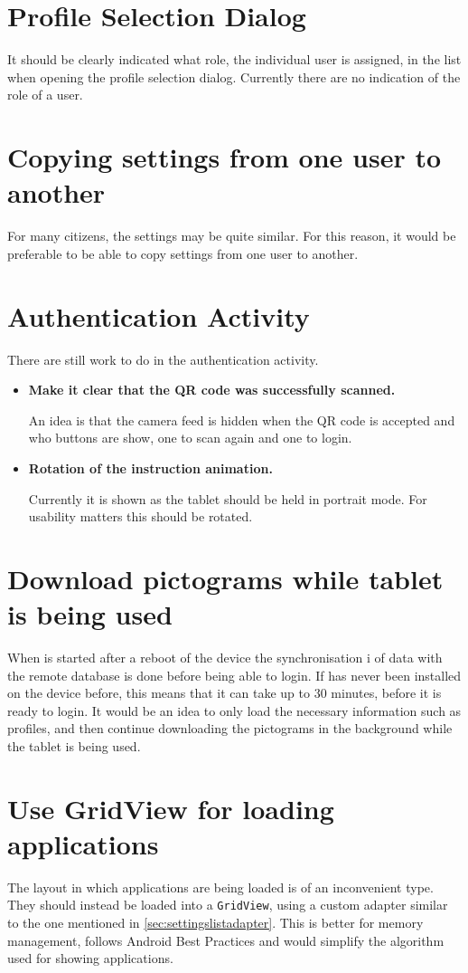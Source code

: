 \section{Profile Selection Dialog}
It should be clearly indicated what role, the individual user is assigned, in the list when opening the profile selection dialog.
Currently there are no indication of the role of a user.

\section{Copying settings from one user to another}
For many citizens, the settings may be quite similar.
For this reason, it would be preferable to be able to copy settings from one user to another.

\section{Authentication Activity}
There are still work to do in the authentication activity.

\begin{itemize}
	\item \textbf{Make it clear that the QR code was successfully scanned.}

	An idea is that the camera feed is hidden when the QR code is accepted and who buttons are show, one to scan again and one to login.
	\item \textbf{Rotation of the instruction animation.}

	Currently it is shown as the tablet should be held in portrait mode. 
	For usability matters this should be rotated. 
\end{itemize}

\section{Download pictograms while tablet is being used}
When \launcher is started after a reboot of the device the synchronisation i of data with the remote database is done before being able to login.
If \launcher has never been installed on the device before, this means that it can take up to 30 minutes, before it is ready to login.
It would be an idea to only load the necessary information such as profiles, and then continue downloading the pictograms in the background while the tablet is being used.

\section{Use GridView for loading applications}
The layout in which applications are being loaded is of an inconvenient type. 
They should instead be loaded into a \lstinline|GridView|, using a custom adapter similar to the one mentioned in \cref{sec:settingslistadapter}. 
This is better for memory management, follows Android Best Practices and would simplify the algorithm used for showing applications. 

